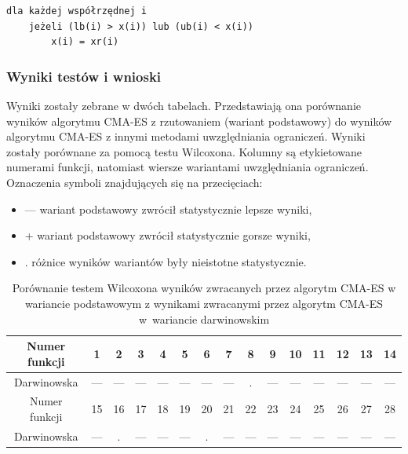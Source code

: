 \documentclass{mini}
\begin{document}
\begin{Verbatim}[baselinestretch=1.1]
dla każdej współrzędnej i
	jeżeli (lb(i) > x(i)) lub (ub(i) < x(i))
		x(i) = xr(i)
\end{Verbatim}

\subsubsection{Wyniki testów i wnioski}
\hspace{3,4ex}Wyniki zostały zebrane w dwóch tabelach. Przedstawiają ona porównanie wyników algorytmu CMA-ES z rzutowaniem (wariant podstawowy) do wyników algorytmu CMA-ES z innymi metodami uwzględniania ograniczeń. Wyniki zostały porównane za pomocą testu Wilcoxona. Kolumny są etykietowane numerami funkcji, natomiast wiersze wariantami uwzględniania ograniczeń. Oznaczenia symboli znajdujących się na przecięciach:
\begin{itemize}[noitemsep]
\item --- wariant podstawowy zwrócił statystycznie lepsze wyniki,
\item + wariant podstawowy zwrócił statystycznie gorsze wyniki,
\item . różnice wyników wariantów były nieistotne statystycznie.
\end{itemize}

\begin{table}[H]
\begin{tabular}{|c|c|c|c|c|c|c|c|c|c|c|c|c|c|c|} \hline
Numer funkcji & 1 & 2 & 3 & 4 & 5 & 6 & 7 & 8 & 9 & 10 & 11 & 12 & 13 & 14 \\ \hline
Darwinowska & --- & --- & --- & --- & --- & --- & --- & . & --- & --- & --- & --- & --- & --- \\ \hline \hline
Numer funkcji & 15 & 16 & 17 & 18 & 19 & 20 & 21 & 22 & 23 & 24 & 25 & 26 & 27 & 28 \\ \hline
Darwinowska & --- & . & --- & --- & --- & . & --- & --- & --- & --- & --- & --- & --- & --- \\ \hline
\end{tabular}
\caption{Porównanie testem Wilcoxona wyników zwracanych przez algorytm CMA-ES w wariancie podstawowym z wynikami zwracanymi przez algorytm CMA-ES w~wariancie darwinowskim}
\end{table}
\end{document}
